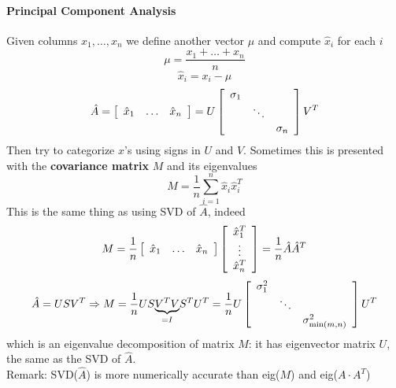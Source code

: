 \documentclass[10pt]{report}
\begin{document}
\paragraph{Principal Component Analysis} Given columns $x_1,\ldots,x_n$ we define another vector $\mu$ and compute $\hat{x}_i$ for each $i$
$$\mu = \frac{x_1+\ldots+x_n}{n}$$
$$\hat{x}_{i} = x_i - \mu$$
$$\hat{A} = \left[\begin{array}{c c c}
\hat{x}_1&\ldots&\hat{x}_n
\end{array}\right] = U\left[\begin{array}{c c c}
\sigma_1\\
&\ddots\\
&&\sigma_n
\end{array}\right]V^T$$
Then try to categorize $x$'s using signs in $U$ and $V$. Sometimes this is presented with the \textbf{covariance matrix} $M$ and its eigenvalues
$$M=\frac{1}{n}\sum_{i=1}^n \hat{x}_i\hat{x}_i^T$$
This is the same thing as using SVD of $\hat{A}$, indeed
$$M=\frac{1}{n}\left[\begin{array}{c c c}
\hat{x}_1&\ldots&\hat{x}_n
\end{array}\right]\left[\begin{array}{c}
\hat{x}_1^T\\\vdots\\\hat{x}_n^T
\end{array}\right]=\frac{1}{n}\hat{A}\hat{A}^T$$
$$\hat{A} = USV^T \Rightarrow M = \frac{1}{n}US\underset{=I}{\underbrace{V^TV}}S^TU^T = \frac{1}{n}U\left[\begin{array}{c c c}
\sigma_1^2\\
&\ddots\\
&&\sigma_{\min(m,n)}^2
\end{array}\right]U^T$$
which is an eigenvalue decomposition of matrix $M$: it has eigenvector matrix $U$, the same as the SVD of $\hat{A}$.\\
Remark: SVD($\hat{A}$) is more numerically accurate than eig($M$) and eig($A\cdot A^T$)
\end{document}
